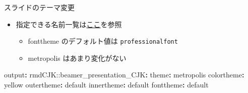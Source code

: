 \documentclass[
  12pt,
  ignorenonframetext,
]{beamer}
\newenvironment{Shaded}{\begin{snugshade}}{\end{snugshade}}
\newcommand{\AttributeTok}[1]{\textcolor[rgb]{0.77,0.63,0.00}{#1}}
\newcommand{\FunctionTok}[1]{\textcolor[rgb]{0.00,0.00,0.00}{#1}}
\newcommand{\KeywordTok}[1]{\textcolor[rgb]{0.13,0.29,0.53}{\textbf{#1}}}
\providecommand{\tightlist}{%
  \setlength{\itemsep}{0pt}\setlength{\parskip}{0pt}}
\begin{document}
\begin{frame}[fragile]{スライドのテーマ変更}
\protect\hypertarget{ux30b9ux30e9ux30a4ux30c9ux306eux30c6ux30fcux30deux5909ux66f4}{}

\begin{itemize}
\tightlist
\item
  指定できる名前一覧は\href{https://deic-web.uab.cat/~iblanes/beamer_gallery/index.html}{ここ}を参照

  \begin{itemize}
  \tightlist
  \item
    fonttheme のデフォルト値は \texttt{professionalfont}
  \item
    metropolis はあまり変化がない
  \end{itemize}
\end{itemize}

\begin{Shaded}
\begin{Highlighting}[]
\FunctionTok{output}\KeywordTok{:}
\AttributeTok{  rmdCJK:}\FunctionTok{:beamer_presentation_CJK}\KeywordTok{:}
\AttributeTok{    }\FunctionTok{theme}\KeywordTok{:}\AttributeTok{ metropolis}
\AttributeTok{    }\FunctionTok{colortheme}\KeywordTok{:}\AttributeTok{ yellow}
\AttributeTok{    }\FunctionTok{outertheme}\KeywordTok{:}\AttributeTok{ default}
\AttributeTok{    }\FunctionTok{innertheme}\KeywordTok{:}\AttributeTok{ default}
\AttributeTok{    }\FunctionTok{fonttheme}\KeywordTok{:}\AttributeTok{ default}
\end{Highlighting}
\end{Shaded}

\end{frame}
\end{document}
